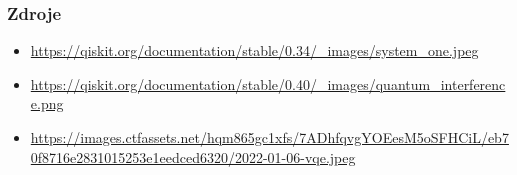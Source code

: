 \documentclass{beamer}
\begin{document}
\begin{frame}[t]
	\frametitle{Zdroje}
	\begin{itemize}
		\item \url{https://qiskit.org/documentation/stable/0.34/_images/system_one.jpeg}
		\item \url{https://qiskit.org/documentation/stable/0.40/_images/quantum_interference.png}
		\item \url{https://images.ctfassets.net/hqm865gc1xfs/7ADhfqvgYOEesM5oSFHCiL/eb70f8716e2831015253e1eedced6320/2022-01-06-vqe.jpeg}
	\end{itemize}
\end{frame}
\end{document}
